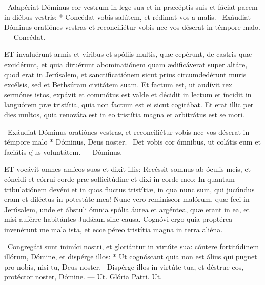 \R\ Adapériat Dóminus cor vestrum in lege sua et in præcéptis suis et fáciat pacem in diébus vestris: * Concédat vobis salútem, et rédimat vos a malis. \V\ Exáudiat Dóminus oratiónes vestras et reconciliétur vobis nec vos déserat in témpore malo. — Concédat.


\lettrine[lines=2]{E}{T} invaluérunt armis et víribus et spóliis multis, quæ cepérunt, de castris quæ excidérunt, et quia diruérunt abominatiónem quam ædificáverat super altáre, quod erat in Jerúsalem, et sanctificatiónem sicut prius circumdedérunt muris excélsis, sed et Bethsúram civitátem suam. Et factum est, ut audívit rex sermónes istos, expávit et commótus est valde et décidit in lectum et íncidit in languórem præ tristítia, quia non factum est ei sicut cogitábat. Et erat illic per dies multos, quia renováta est in eo tristítia magna et arbitrátus est se mori.

\R\ Exáudiat Dóminus oratiónes vestras, et reconciliétur vobis nec vos déserat in témpore malo * Dóminus, Deus noster. \V\ Det vobis cor ómnibus, ut colátis eum et faciátis ejus voluntátem. — Dóminus.



\lettrine[lines=2]{E}{T} vocávit omnes amícos suos et dixit illis: Recéssit somnus ab óculis meis, et cóncidi et córrui corde præ sollicitúdine et dixi in corde meo: In quantam tribulatiónem devéni et in quos fluctus tristítiæ, in qua nunc sum, qui jucúndus eram et diléctus in potestáte mea! Nunc vero reminíscor malórum, quæ feci in Jerúsalem, unde et ábstuli ómnia spólia áurea et argéntea, quæ erant in ea, et misi auférre habitántes Judǽam sine causa. Cognóvi ergo quia proptérea invenérunt me mala ista, et ecce péreo tristítia magna in terra aliéna.

\R\ Congregáti sunt inimíci nostri, et gloriántur in virtúte sua: cóntere fortitúdinem illórum, Dómine, et dispérge illos: * Ut cognóscant quia non est álius qui pugnet pro nobis, nisi tu, Deus noster. \V\ Dispérge illos in virtúte tua, et déstrue eos, protéctor noster, Dómine. — Ut. Glória Patri. Ut.




